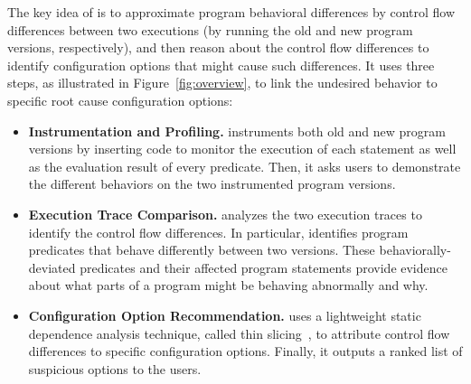 
The key idea of \ourtool is to approximate program behavioral
differences by control flow differences between 
two executions (by running the old
and new program versions, respectively),
and then reason about the control flow differences to
identify configuration options that
might cause such differences. It uses
three steps, as illustrated in Figure~\ref{fig:overview},  to link the undesired
behavior to specific root cause configuration options:

\vspace{-2mm}

\begin{itemize}

\vspace{-1mm}

\item \textbf{Instrumentation and Profiling.} \ourtool
instruments both old and new program versions by inserting
code to monitor the execution of each statement as well as the
evaluation result of every predicate. Then, it asks users to
demonstrate the different behaviors on the two instrumented
program versions. 

\item \textbf{Execution Trace Comparison.}
\ourtool analyzes the two execution traces to identify
the control flow differences. In particular, \ourtool
identifies program predicates that behave
differently between two versions. These
behaviorally-deviated predicates and their
affected program statements
provide evidence about what parts of a program might
be behaving abnormally and why.

\item \textbf{Configuration Option Recommendation.} 
\ourtool uses a lightweight static dependence analysis
technique, called thin slicing~\cite{Sridharan:2007}, to attribute
control flow differences to specific configuration options.
Finally, it outputs a ranked list of suspicious options to the users.


\end{itemize}

\vspace{-1mm}

